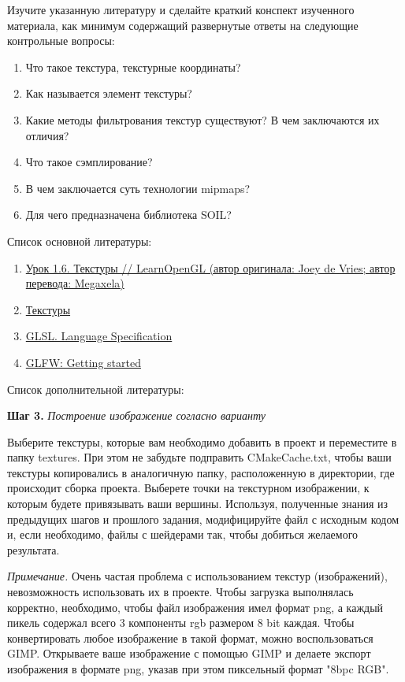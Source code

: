 \documentclass[a4paper,12pt]{article}
\begin{document}
    Изучите указанную литературу и сделайте краткий конспект изученного материала, как минимум содержащий развернутые ответы на следующие контрольные вопросы:

    \begin{enumerate}
        \item 
        Что такое текстура, текстурные координаты?
        \item 
        Как называется элемент текстуры?
        \item 
        Какие методы фильтрования текстур существуют? В чем заключаются их отличия?
        \item 
        Что такое сэмплирование?
        \item 
        В чем заключается суть технологии mipmaps?
        \item 
        Для чего предназначена библиотека SOIL?
    \end{enumerate}

    Список основной литературы:
    \begin{enumerate}
        \item \href{https://habr.com/ru/post/315294/}{Урок 1.6. Текстуры // LearnOpenGL (автор оригинала: Joey de Vries; автор перевода: Megaxela)}
        \item \href{Ravesli.com https://ravesli.com/urok-6-tekstury-v-opengl/}{Текстуры}
        \item \href{https://www.khronos.org/registry/OpenGL/specs/gl/}{GLSL. Language Specification}
        \item \href{https://www.glfw.org/docs/latest/quick.html}{GLFW: Getting started}
    \end{enumerate}

    Список дополнительной литературы:
    
    \textbf{Шаг 3.} \textit{Построение изображение согласно варианту}
    
    Выберите текстуры, которые вам необходимо добавить в проект и переместите в папку \textquotedbl textures\textquotedbl. При этом не забудьте подправить \textquotedbl CMakeCache.txt\textquotedbl, чтобы ваши текстуры копировались в аналогичную папку, расположенную в директории, где происходит сборка проекта. Выберете точки на текстурном изображении, к которым будете привязывать ваши вершины. Используя, полученные знания из предыдущих шагов и прошлого задания, модифицируйте файл с исходным кодом и, если необходимо, файлы с шейдерами так, чтобы добиться желаемого результата.

    \textit{Примечание.} Очень частая проблема с использованием текстур (изображений), невозможность использовать их в проекте. Чтобы загрузка выполнялась корректно, необходимо, чтобы файл изображения имел формат png, а каждый пикель содержал всего 3 компоненты rgb размером 8 bit каждая. Чтобы конвертировать любое изображение в такой формат, можно воспользоваться GIMP. Открываете ваше изображение с помощью GIMP и делаете экспорт изображения в формате png, указав при этом пиксельный формат "8bpc RGB".
    
\end{document}
